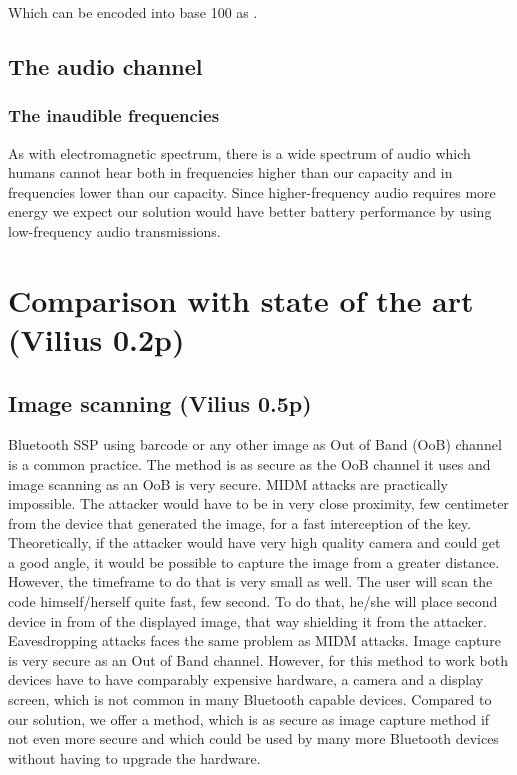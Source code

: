 \documentclass[12pt]{article}
\begin{document}
Which can be encoded into base 100 as .

\subsection{The audio channel}
\label{sub:The audio channel}

\subsubsection{The inaudible frequencies}
\label{subs:The inaudible frequencies}

As with electromagnetic spectrum, there is a wide spectrum of audio which humans cannot hear both in frequencies higher than our capacity and in frequencies lower than our capacity. Since higher-frequency audio requires more energy we expect our solution would have better battery performance by using low-frequency audio transmissions.

\newpage

\section{Comparison with state of the art (Vilius 0.2p)}
\label{sec:Comparison with state of the art}

\subsection{Image scanning (Vilius 0.5p)}
\label{sub:Image scanning}

Bluetooth SSP using barcode or any other image as Out of Band (OoB) channel is a common practice. The method is as secure as the OoB channel it uses and image scanning as an OoB is very secure. MIDM attacks are practically impossible. The attacker would have to be in very close proximity, few centimeter from the device that generated the image, for a fast interception of the key. Theoretically, if the attacker would have very high quality camera and could get a good angle, it would be possible to capture the image from a greater distance. However, the timeframe to do that is very small as well. The user will scan the code himself/herself quite fast, few second. To do that, he/she will place second device in from of the displayed image, that way shielding it from the attacker. Eavesdropping attacks faces the same problem as MIDM attacks.
Image capture is very secure as an Out of Band channel. However, for this method to work both devices have to have comparably expensive hardware, a camera and a display screen, which is not common in many Bluetooth capable devices. Compared to our solution, we offer a method, which is as secure as image capture method if not even more secure and which could be used by many more Bluetooth devices without having to upgrade the hardware.
\end{document}
